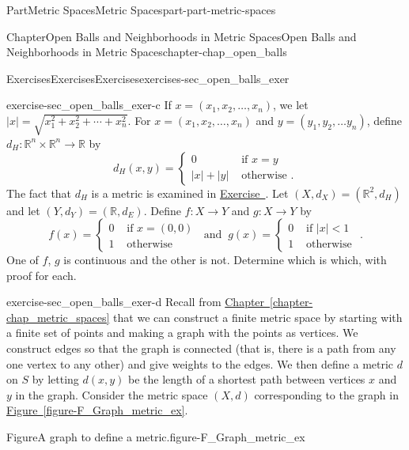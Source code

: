 \documentclass[oneside,10pt,]{book}
\newcommand{\xreffont}{\relax}
\numberwithin{equation}{chapter}
\newcommand{\R}{\mathbb{R}}
\newcommand{\lt}{<}
\newcommand{\amp}{&}
\begin{document}
\begin{partptx}{Part}{Metric Spaces}{}{Metric Spaces}{}{}{part-part-metric-spaces}
\begin{chapterptx}{Chapter}{Open Balls and Neighborhoods in Metric Spaces}{}{Open Balls and Neighborhoods in Metric Spaces}{}{}{chapter-chap_open_balls}
\begin{exercises-section}{Exercises}{Exercises}{}{Exercises}{}{}{exercises-sec_open_balls_exer}
\begin{divisionexercise}{3}{}{}{exercise-sec_open_balls_exer-c}
If \(x = (x_1, x_2, \ldots, x_n)\), we let \(|x| = \sqrt{x_1^2+x_2^2+ \cdots + x_n^2}\). For \(x = (x_1, x_2, \ldots,
x_n)\) and \(y = (y_1, y_2, \ldots y_n)\), define \(d_H: \R^n \times \R^n \to \R\) by%
\begin{equation*}
d_H(x,y) = \begin{cases}0 \amp \text{ if }  x=y \\ |x|+|y| \amp \text{ otherwise } . \end{cases}
\end{equation*}
The fact that \(d_H\) is a metric is examined in \hyperlink{exercise-ex_MS_hub}{Exercise~{\xreffont 7}}. Let \((X,d_X) = (\R^2, d_H)\) and let \((Y,d_Y) = (\R, d_E)\). Define \(f: X \to Y\) and \(g: X \to Y\) by%
\begin{equation*}
f(x) = \begin{cases}0 \amp \text{ if }  x = (0,0) \\ 1 \amp \text{ otherwise } \end{cases}  \  \text{ and }  \ g(x) = \begin{cases}0 \amp \text{ if }  |x|\lt 1 \\ 1 \amp \text{ otherwise } \end{cases}\text{.}
\end{equation*}
One of \(f\), \(g\) is continuous and the other is not. Determine which is which, with proof for each.%
\end{divisionexercise}%
\begin{divisionexercise}{4}{}{}{exercise-sec_open_balls_exer-d}%
Recall from \hyperref[chapter-chap_metric_spaces]{Chapter~{\xreffont\ref{chapter-chap_metric_spaces}}} that we can construct a finite metric space by starting with a finite set of points and making a graph with the points as vertices. We construct edges so that the graph is connected (that is, there is a path from any one vertex to any other) and give weights to the edges. We then define a metric \(d\) on \(S\) by letting \(d(x,y)\) be the length of a shortest path between vertices \(x\) and \(y\) in the graph. Consider the metric space \((X,d)\) corresponding to the graph in \hyperref[figure-F_Graph_metric_ex]{Figure~{\xreffont\ref{figure-F_Graph_metric_ex}}}.%
\begin{figureptx}{Figure}{A graph to define a metric.}{figure-F_Graph_metric_ex}{}%
\begin{image}{0.325}{0.35}{0.325}{}%

\end{image}
\end{figureptx}
\end{divisionexercise}
\end{exercises-section}
\end{chapterptx}
\end{partptx}
\end{document}
